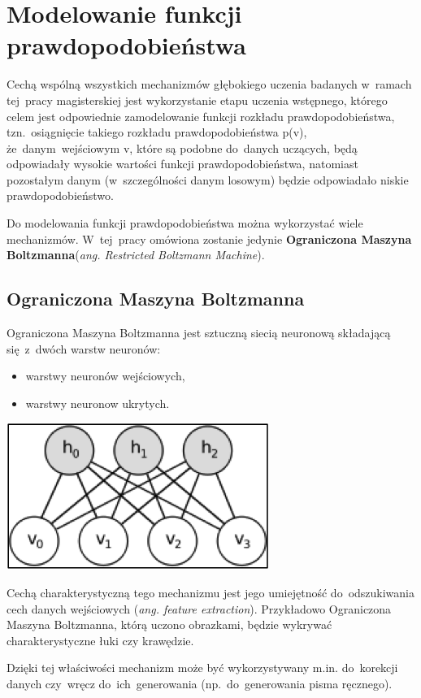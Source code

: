 \section{Modelowanie funkcji prawdopodobieństwa}
Cechą wspólną wszystkich mechanizmów głębokiego uczenia badanych w~ramach tej~pracy magisterskiej jest
wykorzystanie etapu uczenia wstępnego, którego celem jest odpowiednie zamodelowanie
funkcji rozkładu prawdopodobieństwa, tzn.~osiągnięcie takiego rozkładu prawdopodobieństwa p(v),
że~danym~wejściowym v, które są podobne do~danych uczących, będą odpowiadały wysokie wartości
funkcji prawdopodobieństwa, natomiast pozostałym danym (w~szczególności danym losowym) będzie odpowiadało
niskie prawdopodobieństwo.

Do modelowania funkcji prawdopodobieństwa można wykorzystać wiele mechanizmów. W~tej~pracy omówiona zostanie
jedynie \textbf{Ograniczona Maszyna Boltzmanna}(\textit{ang. Restricted Boltzmann
Machine}).

\subsection{Ograniczona Maszyna Boltzmanna}
Ograniczona Maszyna Boltzmanna jest sztuczną siecią neuronową składającą się~z~dwóch warstw neuronów:
\begin{itemize}
  \item warstwy neuronów wejściowych,
  \item warstwy neuronow ukrytych.
\end{itemize}

\begin{Figure}
	\centering
	\includegraphics[width=0.5\linewidth]{img/RBM.png}
\end{Figure}

Cechą charakterystyczną tego mechanizmu jest jego umiejętność do~odszukiwania cech danych wejściowych
(\textit{ang. feature extraction}). Przykładowo Ograniczona Maszyna Boltzmanna, którą uczono obrazkami, będzie
wykrywać charakterystyczne łuki czy krawędzie.

Dzięki tej właściwości mechanizm może być wykorzystywany m.in. do~korekcji danych czy~wręcz do~ich~generowania
(np.~do~generowania pisma ręcznego).

